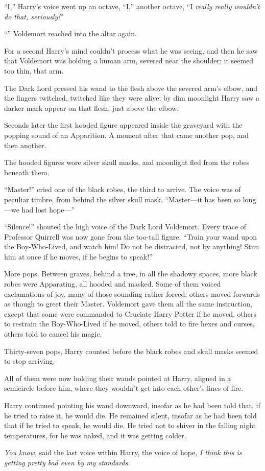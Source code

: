 “I,” Harry’s voice went up an octave, “I,” another octave, “I \emph{really really wouldn’t do that, seriously!}”

“” Voldemort reached into the altar again.

For a second Harry’s mind couldn’t process what he was seeing, and then he saw that Voldemort was holding a human arm, severed near the shoulder; it seemed too thin, that arm.

The Dark Lord pressed his wand to the flesh above the severed arm’s elbow, and the fingers twitched, twitched like they were alive; by dim moonlight Harry saw a darker mark appear on that flesh, just above the elbow.

Seconds later the first hooded figure appeared inside the graveyard with the popping sound of an Apparition. A moment after that came another pop, and then another.

The hooded figures wore silver skull masks, and moonlight fled from the robes beneath them.

“Master!” cried one of the black robes, the third to arrive. The voice was of peculiar timbre, from behind the silver skull mask. “Master—it has been so long—we had lost hope—”

“Silence!” shouted the high voice of the Dark Lord Voldemort. Every trace of Professor Quirrell was now gone from the too-tall figure. “Train your wand upon the Boy-Who-Lived, and watch him! Do not be distracted, not by anything! Stun him at once if he moves, if he begins to speak!”

More pops. Between graves, behind a tree, in all the shadowy spaces, more black robes were Apparating, all hooded and masked. Some of them voiced exclamations of joy, many of those sounding rather forced; others moved forwards as though to greet their Master. Voldemort gave them all the same instruction, except that some were commanded to Cruciate Harry Potter if he moved, others to restrain the Boy-Who-Lived if he moved, others told to fire hexes and curses, others told to cancel his magic.

Thirty-seven pops, Harry counted before the black robes and skull masks seemed to stop arriving.

All of them were now holding their wands pointed at Harry, aligned in a semicircle before him, where they wouldn’t get into each other’s lines of fire.

Harry continued pointing his wand downward, insofar as he had been told that, if he tried to raise it, he would die. He remained silent, insofar as he had been told that if he tried to speak, he would die. He tried not to shiver in the falling night temperatures, for he was naked, and it was getting colder.

\emph{You know,} said the last voice within Harry, the voice of hope, \emph{I think this is getting pretty bad even by my standards.}
